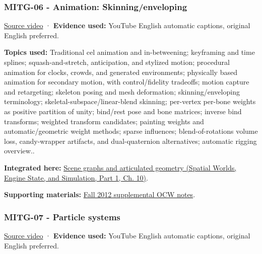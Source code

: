 \subsubsection{MITG-06 - Animation: Skinning/enveloping}\label{04-visual-computing-ii-ch036-mitg-06---animation-skinningenveloping}

\hypertarget{04-visual-computing-ii-ch036-mitg-06---animation-skinningenveloping}{}

\href{https://www.youtube.com/watch?v=oAQkIAGKvUI}{Source video} · \textbf{Evidence used:} YouTube English automatic captions, original English preferred.

\textbf{Topics used:} Traditional cel animation and in-betweening; keyframing and time splines; squash-and-stretch, anticipation, and stylized motion; procedural animation for clocks, crowds, and generated environments; physically based animation for secondary motion, with control/fidelity tradeoffs; motion capture and retargeting; skeleton posing and mesh deformation; skinning/enveloping terminology; skeletal-subspace/linear-blend skinning; per-vertex per-bone weights as positive partition of unity; bind/rest pose and bone matrices; inverse bind transforms; weighted transform candidates; painting weights and automatic/geometric weight methods; sparse influences; blend-of-rotations volume loss, candy-wrapper artifacts, and dual-quaternion alternatives; automatic rigging overview..

\textbf{Integrated here:} \href{../05-Spatial-Worlds-Engine-State-and-Simulation-P01/main.pdf\#04-visual-computing-ii-ch029-scene-graphs-and-articulated-geometry}{Scene graphs and articulated geometry (Spatial Worlds, Engine State, and Simulation, Part 1, Ch. 10)}.

\textbf{Supporting materials:} \href{https://ocw.mit.edu/courses/6-837-computer-graphics-fall-2012/pages/lecture-notes/}{Fall 2012 supplemental OCW notes}.

\subsubsection{MITG-07 - Particle systems}\label{04-visual-computing-ii-ch036-mitg-07---particle-systems}

\hypertarget{04-visual-computing-ii-ch036-mitg-07---particle-systems}{}

\href{https://www.youtube.com/watch?v=-PGuhbZ2khE}{Source video} · \textbf{Evidence used:} YouTube English automatic captions, original English preferred.

